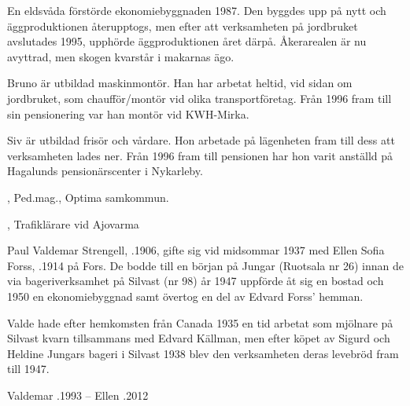 
En eldsvåda förstörde ekonomiebyggnaden 1987. Den byggdes upp på nytt och äggproduktionen återupptogs, men efter att verksamheten på jordbruket avslutades 1995, upphörde äggproduktionen året därpå. Åkerarealen är nu avyttrad, men skogen kvarstår i makarnas ägo.

Bruno är utbildad maskinmontör. Han har arbetat heltid, vid sidan om jordbruket, som chaufför/montör vid olika transportföretag. Från 1996 fram till sin pensionering var han montör vid KWH-Mirka.

Siv är utbildad frisör och vårdare. Hon arbetade på lägenheten fram till dess att verksamheten lades ner. Från 1996 fram till pensionen har hon varit anställd på Hagalunds pensionärscenter i Nykarleby.
\begin{jhchildren}
  \item {}, Ped.mag., Optima samkommun.
  \item {}, Trafiklärare vid Ajovarma
\end{jhchildren}


Paul Valdemar Strengell, .1906, gifte sig vid midsommar 1937 med Ellen Sofia Forss, .1914 på Fors. De bodde till en början på Jungar (Ruotsala nr 26) innan de via bageriverksamhet på Silvast (nr 98) år 1947 uppförde åt sig en bostad och 1950 en ekonomiebyggnad samt övertog en del av Edvard Forss' hemman.

Valde hade efter hemkomsten från Canada 1935 en tid arbetat som mjölnare på Silvast kvarn tillsammans med Edvard Källman, men efter köpet av Sigurd och Heldine Jungars bageri i Silvast 1938 blev den verksamheten deras levebröd fram till 1947.
\begin{jhchildren}
  \item {}
  \item {}
  \item {}
  \item {}
  \item {}
  \item {}
\end{jhchildren}

Valdemar .1993  --  Ellen .2012



